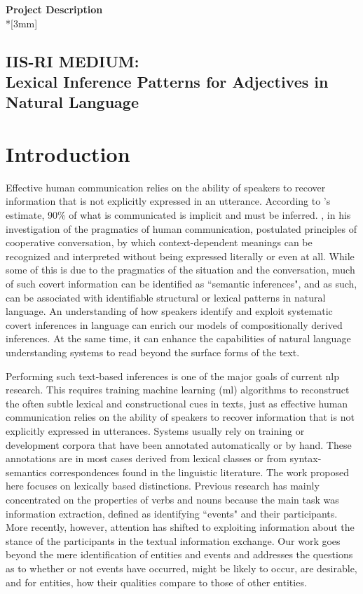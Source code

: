 \documentclass[10pt]{article}
\begin{document}
\begin{center}
{\LARGE{\bf Project Description}}\\*[3mm]
\subsection*{IIS-RI MEDIUM: \\
Lexical Inference Patterns for Adjectives in Natural Language}
\end{center}


\section{\label{intro}Introduction}
Effective human communication relies on the ability of speakers to recover information that is not explicitly expressed in an utterance. According to \cite{graesser1985implicit}'s estimate, 90\% of what 
is communicated is implicit and must be inferred. \cite{grice1975logic}, in his investigation 
of the pragmatics of human communication, postulated principles of cooperative 
conversation, by which context-dependent meanings can be recognized and interpreted 
without being expressed literally or even at all. While some of this is due to the pragmatics of the situation and the conversation, much of such covert information can be identified as ``semantic inferences", and as such, can be associated with identifiable structural or lexical patterns in natural language.
An understanding of how speakers identify and exploit systematic covert inferences in language can enrich our models of compositionally derived inferences. At the same time, it can enhance the capabilities of natural language understanding systems to read beyond the surface forms of the text.

Performing such text-based inferences is one of the major goals of current {\sc nlp} research. 
This requires training machine learning ({\sc ml}) algorithms to  reconstruct the often subtle lexical and constructional cues in texts, just as effective human communication relies on the ability of speakers to recover information that is not explicitly expressed in utterances. Systems usually rely on training or development corpora that have been annotated automatically or by hand.  These annotations are in most cases derived from lexical classes or from syntax-semantics correspondences found in the linguistic literature. The work proposed here focuses on lexically based distinctions. Previous research has mainly concentrated on the properties of verbs and nouns because the main task was information extraction, defined as identifying ``events" and their participants. More recently, however, attention has shifted to exploiting information about the stance of the participants in the textual information exchange. Our work goes beyond the mere identification of entities and events and addresses the questions as to whether or not events have  occurred, might be likely to occur, are desirable, and for entities, how their qualities compare to those of other entities. 
\end{document}
